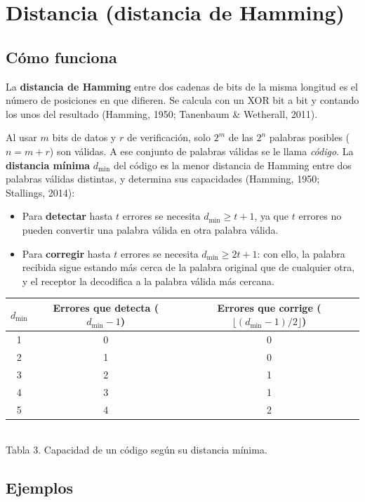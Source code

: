 \documentclass[12pt,letterpaper]{article}
\begin{document}
\section{Distancia (distancia de Hamming)}

\subsection{Cómo funciona}
La \textbf{distancia de Hamming} entre dos cadenas de bits de la misma longitud es el número de posiciones en que difieren. Se calcula con un XOR bit a bit y contando los unos del resultado (Hamming, 1950; Tanenbaum \& Wetherall, 2011).

Al usar $m$ bits de datos y $r$ de verificación, solo $2^m$ de las $2^n$ palabras posibles ($n = m+r$) son válidas. A ese conjunto de palabras válidas se le llama \emph{código}. La \textbf{distancia mínima} $d_{\min}$ del código es la menor distancia de Hamming entre dos palabras válidas distintas, y determina sus capacidades (Hamming, 1950; Stallings, 2014):
\begin{itemize}[itemsep=2pt]
\item Para \textbf{detectar} hasta $t$ errores se necesita $d_{\min} \ge t+1$, ya que $t$ errores no pueden convertir una palabra válida en otra palabra válida.
\item Para \textbf{corregir} hasta $t$ errores se necesita $d_{\min} \ge 2t+1$: con ello, la palabra recibida sigue estando más cerca de la palabra original que de cualquier otra, y el receptor la decodifica a la palabra válida más cercana.
\end{itemize}
\begin{center}
\small
\begin{tabular}{|c|c|c|}
\hline
$d_{\min}$ & \textbf{Errores que detecta} ($d_{\min}-1$) & \textbf{Errores que corrige} ($\lfloor (d_{\min}-1)/2\rfloor$)\\
\hline
1 & 0 & 0\\ \hline
2 & 1 & 0\\ \hline
3 & 2 & 1\\ \hline
4 & 3 & 1\\ \hline
5 & 4 & 2\\ \hline
\end{tabular}\\[3pt]
{\footnotesize Tabla 3. Capacidad de un código según su distancia mínima.}
\end{center}

\subsection{Ejemplos}
\end{document}

